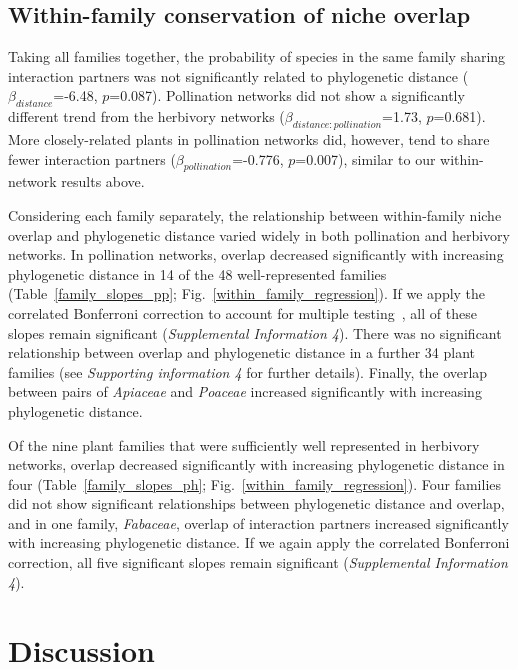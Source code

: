 \documentclass[12pt]{article}
\begin{document}
\begin{spacing}{1.5}
  \subsection*{Within-family conservation of niche overlap} 

    Taking all families together, the probability of species in the same family sharing interaction partners was not significantly related to phylogenetic distance ($\beta_{distance}$=-6.48, $p$=0.087). Pollination networks did not show a significantly different trend from the herbivory networks ($\beta_{distance:pollination}$=1.73, $p$=0.681). More closely-related plants in pollination networks did, however, tend to share fewer interaction partners ($\beta_{pollination}$=-0.776, $p$=0.007), similar to our within-network results above.


    Considering each family separately, the relationship between within-family niche overlap and phylogenetic distance varied widely in both pollination and herbivory networks. 
    In pollination networks, overlap decreased significantly with increasing phylogenetic distance in 14 of the 48 well-represented families (Table~\ref{family_slopes_pp}; Fig.~\ref{within_family_regression}). If we apply the correlated Bonferroni correction to account for multiple testing~\citep{Drezner2016}, all of these slopes remain significant (\emph{Supplemental Information 4}).
    There was no significant relationship between overlap and phylogenetic distance in
    a further 34 plant families (see \emph{Supporting information 4} for further 
    details). Finally, the overlap between pairs of \emph{Apiaceae} and \emph{Poaceae} increased significantly with increasing phylogenetic distance.


    Of the nine plant families that were sufficiently well represented in herbivory 
    networks, overlap decreased significantly with increasing phylogenetic distance in four 
    (Table~\ref{family_slopes_ph}; Fig.~\ref{within_family_regression}). Four
    families did not show significant relationships between phylogenetic distance and overlap,
    and in one family, \emph{Fabaceae}, overlap of interaction partners increased significantly with 
    increasing phylogenetic distance. If we again apply the correlated Bonferroni correction, all five significant slopes remain significant  (\emph{Supplemental Information 4}).


\section*{Discussion} 



\end{spacing}
\end{document}
